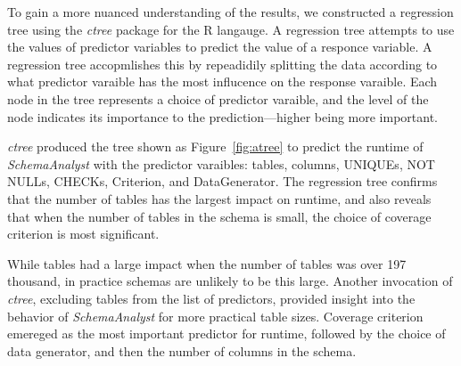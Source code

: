 To gain a more nuanced understanding of the results, we
constructed a regression tree using the \textit{ctree} package for the R langauge. A
regression tree attempts to use the values of predictor variables to
predict the value of a responce variable. A regression tree accopmlishes
this by repeadidily splitting the data according to what predictor varaible has the
most influcence on the response varaible. Each node in the tree represents a choice
of predictor varaible, and the level of the node indicates its
importance to the prediction---higher being more important.

\textit{ctree} produced the tree shown as Figure~\ref{fig:atree} to
predict the runtime of \textit{SchemaAnalyst} with the predictor varaibles:
tables, columns, UNIQUEs, NOT NULLs, CHECKs, Criterion, and
DataGenerator. The regression tree confirms that the number of
tables has the largest impact on runtime, and also reveals that when the number of tables in the schema is small, 
the choice of coverage criterion is most significant.


While tables had a large impact when the number of tables was over 197
thousand, in practice schemas are unlikely to be this large. Another invocation of \textit{ctree}, excluding tables from the list of
predictors, provided insight into the behavior of \textit{SchemaAnalyst}
for more practical table sizes. Coverage criterion emereged as the most important predictor for runtime, followed by the choice of data
generator, and then the number of columns in the schema.
